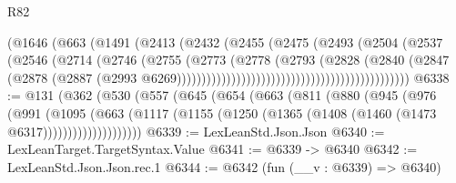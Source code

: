 \begin{lexlean}{R82}
\begin{coremodule}
                                                    (@1646
                                                      (@663
                                                        (@1491
                                                          (@2413
                                                            (@2432
                                                              (@2455
                                                                (@2475
                                                                  (@2493
                                                                    (@2504
                                                                      (@2537
                                                                        (@2546
                                                                          (@2714
                                                                            (@2746
                                                                              (@2755
                                                                                (@2773
                                                                                  (@2778
                                                                                    (@2793
                                                                                      (@2828
                                                                                        (@2840
                                                                                          (@2847
                                                                                            (@2878
                                                                                              (@2887
                                                                                                (@2993
                                                                                                  @6269)))))))))))))))))))))))))))))))))))))))))))))))
@6338 := @131
    (@362
      (@530
        (@557
          (@645
            (@654
              (@663
                (@811
                  (@880
                    (@945
                      (@976
                        (@991
                          (@1095
                            (@663
                              (@1117
                                (@1155 (@1250 (@1365 (@1408 (@1460 (@1473 @6317))))))))))))))))))))
@6339 := LexLeanStd.Json.Json
@6340 := LexLeanTarget.TargetSyntax.Value
@6341 := @6339 -> @6340
@6342 := LexLeanStd.Json.Json.rec.{1}
@6344 := @6342 (fun (__v : @6339) => @6340)

\end{coremodule}
\end{lexlean}
